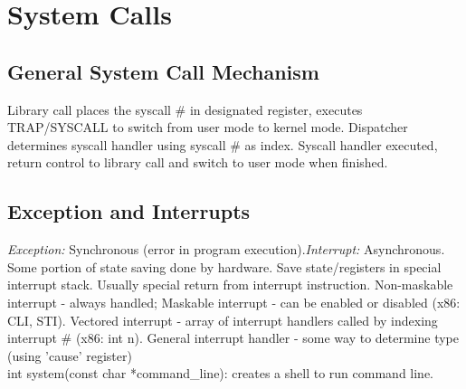 \section{System Calls}
\subsection*{General System Call Mechanism}
Library call places the syscall \# in designated register, executes TRAP/SYSCALL to switch from user mode to kernel mode. Dispatcher determines syscall handler using syscall \# as index. Syscall handler executed, return control to library call and switch to user mode when finished.

\subsection*{Exception and Interrupts}
\emph{Exception:} Synchronous (error in program execution).\emph{Interrupt:} Asynchronous. Some portion of state saving done by hardware. Save state/registers in special interrupt stack.  Usually special return from interrupt instruction. Non-maskable interrupt - always handled; Maskable interrupt - can be enabled or disabled (x86: CLI, STI). Vectored interrupt - array of interrupt handlers called by indexing interrupt \# (x86: int n). General interrupt handler - some way to determine type (using 'cause' register)\\
int system(const char *command\_line): creates a shell to run command line.